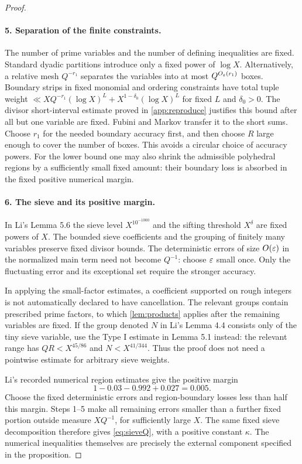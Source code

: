 \begin{proof}
\paragraph{5. Separation of the finite constraints.}
The number of prime variables and the number of defining inequalities
are fixed. Standard dyadic partitions introduce only a fixed power
of $\log X$. Alternatively, a relative mesh $Q^{-r_1}$ separates the
variables into at most $Q^{O_\varepsilon(r_1)}$ boxes.
Boundary strips in fixed monomial and ordering constraints have
total tuple weight $\ll XQ^{-r_1}(\log X)^L+X^{1-\delta_0}(\log X)^L$
for fixed $L$ and $\delta_0>0$. The divisor short-interval estimate
proved in \cref{app:reproduce} justifies this bound after all but one
variable are fixed.
Fubini and Markov transfer it to the short sums.
Choose $r_1$ for the needed boundary accuracy first, and then choose
$R$ large enough to cover the number of boxes.
This avoids a circular choice of accuracy powers.
For the lower bound one may also shrink the admissible polyhedral
regions by a sufficiently small fixed amount: their boundary loss is
absorbed in the fixed positive numerical margin.

\paragraph{6. The sieve and its positive margin.}
In Li's Lemma 5.6 the sieve level $X^{10^{-1000}}$ and the sifting
threshold $X^\delta$ are fixed powers of $X$.
The bounded sieve coefficients and the grouping of finitely many
variables preserve fixed divisor bounds. The deterministic errors of
size $O(\varepsilon)$ in the normalized main term need not become $Q^{-1}$:
choose $\varepsilon$ small once. Only the fluctuating error and its exceptional
set require the stronger accuracy.

In applying the small-factor estimates, a coefficient supported on
rough integers is not automatically declared to have cancellation.
The relevant groups contain prescribed prime factors, to which
\cref{lem:products} applies after the remaining variables are fixed.
If the group denoted $N$ in Li's Lemma 4.4 consists only of the tiny
sieve variable, use the Type I estimate in Lemma 5.1 instead:
the relevant range has $QR<X^{45/86}$ and $N<X^{41/344}$.
Thus the proof does not need a pointwise estimate for arbitrary
sieve weights.

Li's recorded numerical region estimates give the positive margin
\[
                  1-0.03-0.992+0.027=0.005.
\]
Choose the fixed deterministic errors and region-boundary losses less
than half this margin. Steps 1--5 make all remaining errors smaller
than a further fixed portion outside measure $XQ^{-1}$, for sufficiently
large $X$. The same fixed sieve decomposition therefore gives
\eqref{eq:sieveQ}, with a positive constant $\kappa$.
The numerical inequalities themselves are precisely the external
component specified in the proposition.
\end{proof}

